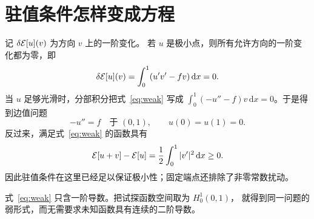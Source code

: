 \section{驻值条件怎样变成方程}
\label{sec:stationary}
记 $\delta \mathcal{E}[u](v)$ 为方向 $v$ 上的一阶变化。
若 $u$ 是极小点，则所有允许方向的一阶变化都为零，即
\begin{equation}
  \delta \mathcal{E}[u](v)
    =\int_0^1(u'v'-fv)\,\mathrm{d}x=0.
  \label{eq:weak}
\end{equation}
当 $u$ 足够光滑时，分部积分把式~\eqref{eq:weak} 写成
$\int_0^1(-u''-f)v\,\mathrm{d}x=0$。于是得到边值问题
\begin{equation}
  -u''=f\quad\text{于 }(0,1),\qquad u(0)=u(1)=0.
  \label{eq:boundary}
\end{equation}
反过来，满足式~\eqref{eq:weak} 的函数具有
\[
  \mathcal{E}[u+v]-\mathcal{E}[u]=\frac12\int_0^1|v'|^2\,\mathrm{d}x\geq 0.
\]
因此驻值条件在这里已经足以保证极小性；固定端点还排除了非零常数扰动。

\begin{observation}
式~\eqref{eq:weak} 只含一阶导数。把试探函数空间取为 $H_0^1(0,1)$，
就得到同一问题的弱形式，而无需要求未知函数具有连续的二阶导数。
\end{observation}
